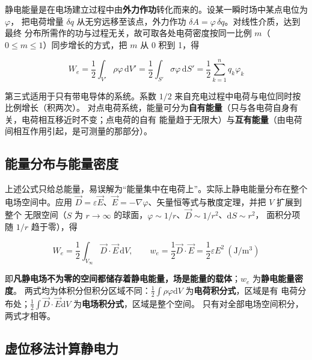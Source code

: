静电能量是在电场建立过程中由\textbf{外力作功}转化而来的。设某一瞬时场中某点电位为 $\varphi$，
把电荷增量 $\delta q$ 从无穷远移至该点，外力作功 $\delta A=\varphi\,\delta q$。对线性介质，达到最终
分布所需作的功与过程无关，故可取各处电荷密度按同一比例 $m$（$0\le m\le1$）同步增长的方式，把
$m$ 从 0 积到 1，得
\begin{formulaBox}
\[
W_e=\frac{1}{2}\int_{V'}\rho\varphi\,\mathrm{d}V'
=\frac{1}{2}\int_{S'}\sigma\varphi\,\mathrm{d}S'
=\frac{1}{2}\sum_{k=1}^{n}q_k\varphi_k
\]
\end{formulaBox}

第三式适用于只有带电导体的系统。系数 $1/2$ 来自充电过程中电荷与电位同时按比例增长（积两次）。
对点电荷系统，能量可分为\textbf{自有能量}（只与各电荷自身有关，电荷相互移近时不变；点电荷的自有
能量趋于无限大）与\textbf{互有能量}（由电荷间相互作用引起，是可测量的那部分）。

\subsection{能量分布与能量密度}

上述公式只给总能量，易误解为“能量集中在电荷上”。实际上静电能量分布在整个电场空间中。应用
$\vec{D}=\varepsilon\vec{E}$、$\vec{E}=-\nabla\varphi$、矢量恒等式与散度定理，并把 $V$ 扩展到整个
无限空间（$S$ 为 $r\to\infty$ 的球面，$\varphi\sim1/r$、$\vec{D}\sim1/r^2$、$\mathrm{d}S\sim r^2$，
面积分项随 $1/r$ 趋于零），得
\begin{formulaBox}
\[
W_e=\frac{1}{2}\int_{V_\infty}\vec{D}\cdot\vec{E}\,\mathrm{d}V,
\qquad
w_e=\frac{1}{2}\vec{D}\cdot\vec{E}=\frac{1}{2}\varepsilon E^2\ (\mathrm{J/m^3})
\]
\end{formulaBox}

即\textbf{凡静电场不为零的空间都储存着静电能量，场是能量的载体}；$w_e$ 为\textbf{静电能量密度}。
两式均为体积分但积分区域不同：$\frac12\int\rho\varphi\mathrm{d}V$ 为\textbf{电荷积分式}，区域是有
电荷分布处；$\frac12\int\vec{D}\cdot\vec{E}\mathrm{d}V$ 为\textbf{电场积分式}，区域是整个空间。
只有对全部电场空间积分，两式才相等。


\subsection{虚位移法计算静电力}

